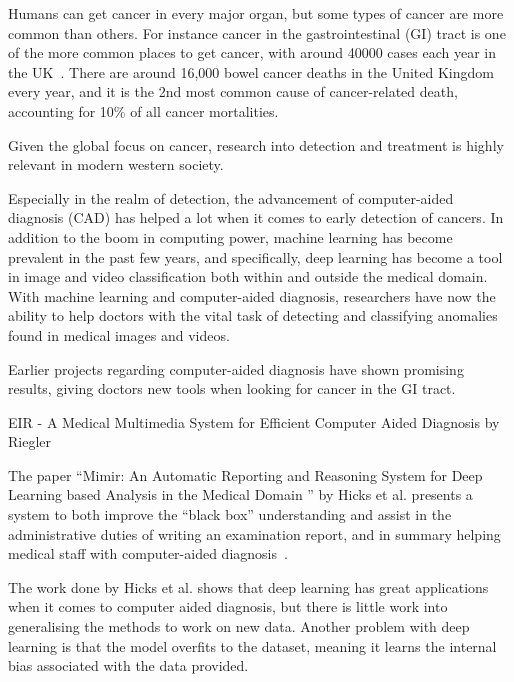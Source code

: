 Humans can get cancer in every major organ, but some types of cancer are more common than others.    
For instance cancer in the gastrointestinal (GI) tract is one of the more common places to get cancer, with around 40000 cases each year in the UK~\cite{UKCancerBowel}. There are around 16,000 bowel cancer deaths in the United Kingdom every year, and it is the 2nd most common cause of cancer-related death, accounting for 10\% of all cancer mortalities.

Given the global focus on cancer, research into detection and treatment is highly relevant in modern western society. 

Especially in the realm of detection, the advancement of computer-aided diagnosis (CAD) has helped a lot when it comes to early detection of cancers. In addition to the boom in computing power, machine learning has become prevalent in the past few years, and specifically, deep learning has become a tool in image and video classification both within and outside the medical domain. 
With machine learning and computer-aided diagnosis, researchers have now the ability to help doctors with the vital task of detecting and classifying anomalies found in medical images and videos.

Earlier projects regarding computer-aided diagnosis have shown promising results, giving doctors new tools when looking for cancer in the GI tract.

EIR - A Medical Multimedia System for Efficient
Computer Aided Diagnosis by Riegler 

The paper ``Mimir: An Automatic Reporting and Reasoning System for Deep
Learning based Analysis in the Medical Domain
'' by Hicks et al. presents a system to both improve the ``black box'' understanding and assist in the administrative duties of writing an examination report, and in summary helping medical staff with computer-aided diagnosis~\cite{25953}. 

The work done by Hicks et al. shows that deep learning has great applications when it comes to computer aided diagnosis, but there is little work into generalising the methods to work on new data. Another problem with deep learning is that the model overfits to the dataset, meaning it learns the internal bias associated with the data provided. 

